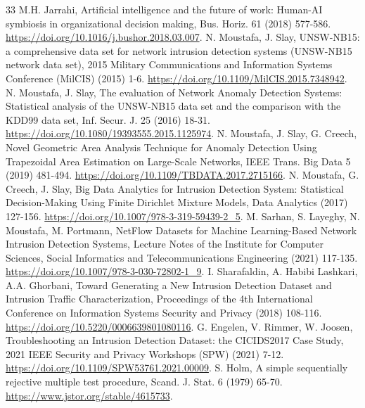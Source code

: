 \documentclass[11pt,letterpaper]{article}
\begin{document}
\begin{thebibliography}{33}
M.H. Jarrahi, Artificial intelligence and the future of work: Human-AI symbiosis in organizational decision making, Bus. Horiz. 61 (2018) 577-586. \url{https://doi.org/10.1016/j.bushor.2018.03.007}.
N. Moustafa, J. Slay, UNSW-NB15: a comprehensive data set for network intrusion detection systems (UNSW-NB15 network data set), 2015 Military Communications and Information Systems Conference (MilCIS) (2015) 1-6. \url{https://doi.org/10.1109/MilCIS.2015.7348942}.
N. Moustafa, J. Slay, The evaluation of Network Anomaly Detection Systems: Statistical analysis of the UNSW-NB15 data set and the comparison with the KDD99 data set, Inf. Secur. J. 25 (2016) 18-31. \url{https://doi.org/10.1080/19393555.2015.1125974}.
N. Moustafa, J. Slay, G. Creech, Novel Geometric Area Analysis Technique for Anomaly Detection Using Trapezoidal Area Estimation on Large-Scale Networks, IEEE Trans. Big Data 5 (2019) 481-494. \url{https://doi.org/10.1109/TBDATA.2017.2715166}.
N. Moustafa, G. Creech, J. Slay, Big Data Analytics for Intrusion Detection System: Statistical Decision-Making Using Finite Dirichlet Mixture Models, Data Analytics (2017) 127-156. \url{https://doi.org/10.1007/978-3-319-59439-2_5}.
M. Sarhan, S. Layeghy, N. Moustafa, M. Portmann, NetFlow Datasets for Machine Learning-Based Network Intrusion Detection Systems, Lecture Notes of the Institute for Computer Sciences, Social Informatics and Telecommunications Engineering (2021) 117-135. \url{https://doi.org/10.1007/978-3-030-72802-1_9}.
I. Sharafaldin, A. Habibi Lashkari, A.A. Ghorbani, Toward Generating a New Intrusion Detection Dataset and Intrusion Traffic Characterization, Proceedings of the 4th International Conference on Information Systems Security and Privacy (2018) 108-116. \url{https://doi.org/10.5220/0006639801080116}.
G. Engelen, V. Rimmer, W. Joosen, Troubleshooting an Intrusion Detection Dataset: the CICIDS2017 Case Study, 2021 IEEE Security and Privacy Workshops (SPW) (2021) 7-12. \url{https://doi.org/10.1109/SPW53761.2021.00009}.
S. Holm, A simple sequentially rejective multiple test procedure, Scand. J. Stat. 6 (1979) 65-70. \url{https://www.jstor.org/stable/4615733}.
\end{thebibliography}\endgroup
\end{document}
